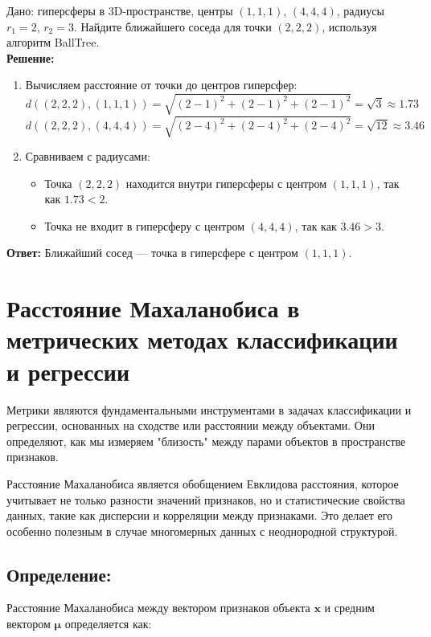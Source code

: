 Дано: гиперсферы в 3D-пространстве, центры \((1, 1, 1)\), \((4, 4, 4)\), радиусы \(r_1 = 2\), \(r_2 = 3\). Найдите ближайшего соседа для точки \((2, 2, 2)\), используя алгоритм BallTree.\\
\textbf{Решение:}
\begin{enumerate}
    \item Вычисляем расстояние от точки до центров гиперсфер:
    \[
    d((2, 2, 2), (1, 1, 1)) = \sqrt{(2-1)^2 + (2-1)^2 + (2-1)^2} = \sqrt{3} \approx 1.73
    \]
    \[
    d((2, 2, 2), (4, 4, 4)) = \sqrt{(2-4)^2 + (2-4)^2 + (2-4)^2} = \sqrt{12} \approx 3.46
    \]
    \item Сравниваем с радиусами:
    \begin{itemize}
        \item Точка \((2, 2, 2)\) находится внутри гиперсферы с центром \((1, 1, 1)\), так как \(1.73 < 2\).
        \item Точка не входит в гиперсферу с центром \((4, 4, 4)\), так как \(3.46 > 3\).
    \end{itemize}
\end{enumerate}
\textbf{Ответ:} Ближайший сосед — точка в гиперсфере с центром \((1, 1, 1)\).

\section{Расстояние Махаланобиса в метрических методах классификации и регрессии}

Метрики являются фундаментальными инструментами в задачах классификации и регрессии, основанных на сходстве или расстоянии между объектами. Они определяют, как мы измеряем "близость" между парами объектов в пространстве признаков.

Расстояние Махаланобиса является обобщением Евклидова расстояния, которое учитывает не только разности значений признаков, но и статистические свойства данных, такие как дисперсии и корреляции между признаками. Это делает его особенно полезным в случае многомерных данных с неоднородной структурой.

\subsection{Определение:}

Расстояние Махаланобиса между вектором признаков объекта \( \mathbf{x} \) и средним вектором \( \mathbf{\mu} \) определяется как:

